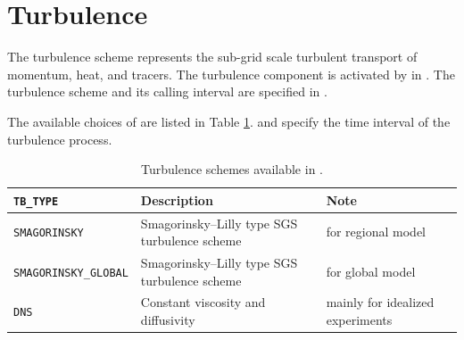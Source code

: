 \section{Turbulence}
\label{sec:basic_usel_turbulence}
The turbulence scheme represents the sub-grid scale turbulent transport of momentum, heat, and tracers.
The turbulence component is activated by  in .
The turbulence scheme and its calling interval are specified in .


The available choices of  are listed in Table \ref{tab:tb_scheme_list}.
 and  specify the time interval of the turbulence process.

\begin{table}[htbp]
\caption{Turbulence schemes available in \scaledg.}
\label{tab:tb_scheme_list}
\begin{center}
\begin{tabularx}{150mm}{lXX}
\hline
\rowcolor[gray]{0.9}
\verb|TB_TYPE| & Description & Note \\
\hline
\verb|SMAGORINSKY|         & Smagorinsky--Lilly type SGS turbulence scheme & for regional model \\
\verb|SMAGORINSKY_GLOBAL|  & Smagorinsky--Lilly type SGS turbulence scheme & for global model \\
\verb|DNS|                 & Constant viscosity and diffusivity & mainly for idealized experiments \\
\hline
\end{tabularx}
\end{center}
\end{table}


